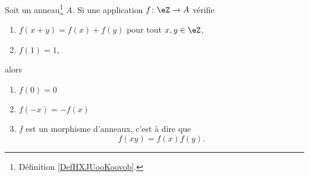 \begin{lemma}	\label{LEMooILYLooTDRtYj}
	Soit un anneau\footnote{Définition \ref{DefHXJUooKoovob}.} \( A\). Si une application \(f \colon \eZ\to A  \) vérifie
	\begin{enumerate}
		\item
		      \( f(x+y)=f(x)+f(y)\) pour tout \( x,y\in \eZ\),
		\item
		      \( f(1)=1\),
	\end{enumerate}
	alors
	\begin{enumerate}
		\item		\label{ITEMooUQKWooByNDTK}
		      \( f(0)=0\)
		\item	\label{ITEMooYOEPooKOQQPH}
		      \( f(-x)=-f(x)\)
		\item	\label{ITEMooKTSDooExAJHd}
		      \( f\) est un morphisme d'anneaux, c'est à dire que
		      \begin{equation}
			      f(xy)=f(x)f(y).
		      \end{equation}
	\end{enumerate}
\end{lemma}

